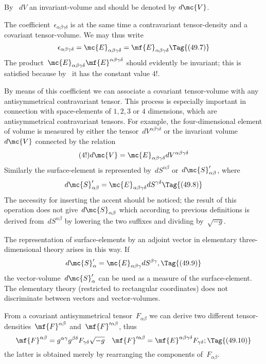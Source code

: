 \documentclass[12pt]{book}
\begin{document}
By~ $dV$ an invariant\hyp{}volume and should be denoted by $d\mc{V}$.

The coefficient~$\epsilon_{\alpha\beta\gamma\delta}$ is at the same time a contravariant tensor\hyp{}density
and a covariant tensor\hyp{}volume.
We may thus write
\[
\epsilon_{\alpha\beta\gamma\delta} = \mc{E}_{\alpha\beta\gamma\delta} = \mf{E}_{\alpha\beta\gamma\delta}
\Tag{(49.7)}
\]
The product~$\mc{E}_{\alpha\beta\gamma\delta}\mf{E}^{\alpha\beta\gamma\delta}$ should evidently be invariant;
this is satisfied because by~ it has the constant value $4!$.

By means of this coefficient we can associate a covariant tensor\hyp{}volume with any antisymmetrical contravariant tensor.
This process is especially important in connection with space\hyp{}elements of $1,2,3$ or $4$ dimensions, which are
antisymmetrical contravariant tensors.
For example, the four\hyp{}dimensional element of volume is measured by either the tensor~$dV^{\alpha\beta\gamma\delta}$
or the invariant volume $d\mc{V}$ connected by the relation
\[
(4!)d\mc{V} = \mc{E}_{\alpha\beta\gamma\delta} dV^{\alpha\beta\gamma\delta}
\]
Similarly the surface\hyp{}element is represented by~$dS^{\alpha\beta}$ or~$d\mc{S}'_{\alpha\beta}$, where
\[
d\mc{S}'_{\alpha\beta} = \mc{E}_{\alpha\beta\gamma\delta} dS^{\gamma\delta}
\Tag{(49.8)}
\]
The necessity for inserting the accent should be noticed; the result of this operation does not
give~$d\mc{S}_{\alpha\beta}$ which according to previous definitions is derived from~$dS^{\alpha\beta}$ by
lowering the two suffixes and dividing by~$\sqrt{-g}$.

The representation of surface\hyp{}elements by an adjoint vector in elementary three\hyp{}dimensional theory arises in this way.
If
\[
d\mc{S}'_\alpha = \mc{E}_{\alpha\beta\gamma} dS^{\beta\gamma},
\Tag{(49.9)}
\]
the vector\hyp{}volume~$d\mc{S}'_\alpha$ can be used as a measure of the surface\hyp{}element.
The elementary theory (restricted to rectangular coordinates) does not discriminate between vectors and vector\hyp{}volumes.

From a covariant antisymmetrical tensor~$F_{\alpha\beta}$ we can derive two different
tensor\hyp{}densities~$\mf{F}^{\alpha\beta}$ and~$\mf{F}'^{\alpha\beta}$, thus
\[
\mf{F}^{\alpha\beta} = g^{\alpha\gamma} g^{\beta\delta} F_{\gamma\delta} \sqrt{-g} \quad \mf{F}'^{\alpha\beta} = \mf{E}^{\alpha\beta\gamma\delta} F_{\gamma\delta};
\Tag{(49.10)}
\]
the latter is obtained merely by rearranging the components of~$F_{\alpha\beta}$.
\end{document}
